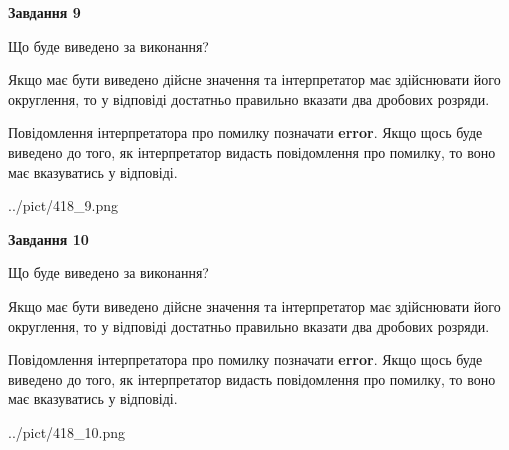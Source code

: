 \documentclass[12pt, ukrainian]{article}
\begin{document}
{\begin {Large}
{\begin {center}\textbf{Завдання 9}\end {center}}\par
Що буде виведено за виконання? \par

Якщо має бути виведено дійсне значення та інтерпретатор має здійснювати його округлення, 
то у відповіді достатньо правильно вказати два дробових розряди.

Повідомлення інтерпретатора про помилку позначати \textbf{error}.
Якщо щось буде виведено до того, як інтерпретатор видасть повідомлення про помилку, 
то воно має вказуватись у відповіді. \par

\begin{center}
	{../pict/418_9.png}
\end{center}
\newpage

{\begin {center}\textbf{Завдання 10}\end {center}}\par
Що буде виведено за виконання? \par

Якщо має бути виведено дійсне значення та інтерпретатор має здійснювати його округлення, 
то у відповіді достатньо правильно вказати два дробових розряди.

Повідомлення інтерпретатора про помилку позначати \textbf{error}.
Якщо щось буде виведено до того, як інтерпретатор видасть повідомлення про помилку, 
то воно має вказуватись у відповіді. \par

\begin{center}
	{../pict/418_10.png}
\end{center}
\newpage

\end {Large}}
\end{document}
